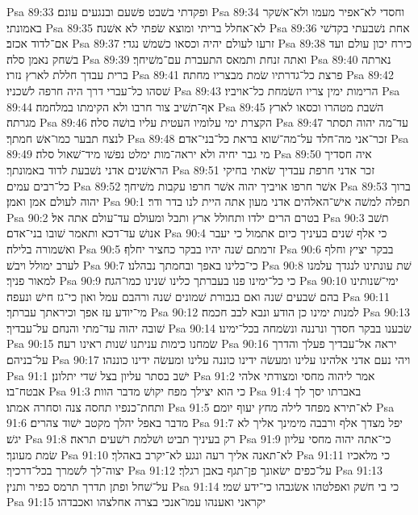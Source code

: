 Psa 89:33  ופקדתי בשׁבט פשׁעם ובנגעים עונם׃
Psa 89:34  וחסדי לא־אפיר מעמו ולא־אשׁקר באמונתי׃
Psa 89:35  לא־אחלל בריתי ומוצא שׂפתי לא אשׁנה׃
Psa 89:36  אחת נשׁבעתי בקדשׁי אם־לדוד אכזב׃
Psa 89:37  זרעו לעולם יהיה וכסאו כשׁמשׁ נגדי׃
Psa 89:38  כירח יכון עולם ועד בשׁחק נאמן סלה׃
Psa 89:39  ואתה זנחת ותמאס התעברת עם־משׁיחך׃
Psa 89:40  נארתה ברית עבדך חללת לארץ נזרו׃
Psa 89:41  פרצת כל־גדרתיו שׂמת מבצריו מחתה׃
Psa 89:42  שׁסהו כל־עברי דרך היה חרפה לשׁכניו׃
Psa 89:43  הרימות ימין צריו השׂמחת כל־אויביו׃
Psa 89:44  אף־תשׁיב צור חרבו ולא הקימתו במלחמה׃
Psa 89:45  השׁבת מטהרו וכסאו לארץ מגרתה׃
Psa 89:46  הקצרת ימי עלומיו העטית עליו בושׁה סלה׃
Psa 89:47  עד־מה יהוה תסתר לנצח תבער כמו־אשׁ חמתך׃
Psa 89:48  זכר־אני מה־חלד על־מה־שׁוא בראת כל־בני־אדם׃
Psa 89:49  מי גבר יחיה ולא יראה־מות ימלט נפשׁו מיד־שׁאול סלה׃
Psa 89:50  איה חסדיך הראשׁנים אדני נשׁבעת לדוד באמונתך׃
Psa 89:51  זכר אדני חרפת עבדיך שׂאתי בחיקי כל־רבים עמים׃
Psa 89:52  אשׁר חרפו אויביך יהוה אשׁר חרפו עקבות משׁיחך׃
Psa 89:53  ברוך יהוה לעולם אמן ואמן׃
Psa 90:1  תפלה למשׁה אישׁ־האלהים אדני מעון אתה היית לנו בדר ודר׃
Psa 90:2  בטרם הרים ילדו ותחולל ארץ ותבל ומעולם עד־עולם אתה אל׃
Psa 90:3  תשׁב אנושׁ עד־דכא ותאמר שׁובו בני־אדם׃
Psa 90:4  כי אלף שׁנים בעיניך כיום אתמול כי יעבר ואשׁמורה בלילה׃
Psa 90:5  זרמתם שׁנה יהיו בבקר כחציר יחלף׃
Psa 90:6  בבקר יציץ וחלף לערב ימולל ויבשׁ׃
Psa 90:7  כי־כלינו באפך ובחמתך נבהלנו׃
Psa 90:8  שׁת עונתינו לנגדך עלמנו למאור פניך׃
Psa 90:9  כי כל־ימינו פנו בעברתך כלינו שׁנינו כמו־הגה׃
Psa 90:10  ימי־שׁנותינו בהם שׁבעים שׁנה ואם בגבורת שׁמונים שׁנה ורהבם עמל ואון כי־גז חישׁ ונעפה׃
Psa 90:11  מי־יודע עז אפך וכיראתך עברתך׃
Psa 90:12  למנות ימינו כן הודע ונבא לבב חכמה׃
Psa 90:13  שׁובה יהוה עד־מתי והנחם על־עבדיך׃
Psa 90:14  שׂבענו בבקר חסדך ונרננה ונשׂמחה בכל־ימינו׃
Psa 90:15  שׂמחנו כימות עניתנו שׁנות ראינו רעה׃
Psa 90:16  יראה אל־עבדיך פעלך והדרך על־בניהם׃
Psa 90:17  ויהי נעם אדני אלהינו עלינו ומעשׂה ידינו כוננה עלינו ומעשׂה ידינו כוננהו׃
Psa 91:1  ישׁב בסתר עליון בצל שׁדי יתלונן׃
Psa 91:2  אמר ליהוה מחסי ומצודתי אלהי אבטח־בו׃
Psa 91:3  כי הוא יצילך מפח יקושׁ מדבר הוות׃
Psa 91:4  באברתו יסך לך ותחת־כנפיו תחסה צנה וסחרה אמתו׃
Psa 91:5  לא־תירא מפחד לילה מחץ יעוף יומם׃
Psa 91:6  מדבר באפל יהלך מקטב ישׁוד צהרים׃
Psa 91:7  יפל מצדך אלף ורבבה מימינך אליך לא יגשׁ׃
Psa 91:8  רק בעיניך תביט ושׁלמת רשׁעים תראה׃
Psa 91:9  כי־אתה יהוה מחסי עליון שׂמת מעונך׃
Psa 91:10  לא־תאנה אליך רעה ונגע לא־יקרב באהלך׃
Psa 91:11  כי מלאכיו יצוה־לך לשׁמרך בכל־דרכיך׃
Psa 91:12  על־כפים ישׂאונך פן־תגף באבן רגלך׃
Psa 91:13  על־שׁחל ופתן תדרך תרמס כפיר ותנין׃
Psa 91:14  כי בי חשׁק ואפלטהו אשׂגבהו כי־ידע שׁמי׃
Psa 91:15  יקראני ואענהו עמו־אנכי בצרה אחלצהו ואכבדהו׃
